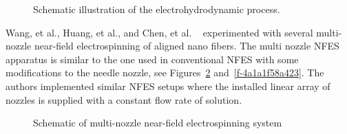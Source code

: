 \documentclass[5p,,preprint,12pt,twocolumn]{elsarticle}
\makeatletter
\def\fixFloatSize#1{}%
\makeatother
\begin{document}
\bgroup
\fixFloatSize{images/fa274bb7-a79d-48ae-9349-953df62c0094-ugupta_00.png}
\begin{figure}[!htbp]
\centering \makeatletter{}
\makeatother 
\caption{{Schematic illustration of the electrohydrodynamic process. \unskip~\protect\cite{527120:11974310}}}
\label{f-74de1f00848b}
\end{figure}
\egroup
Wang, et al., Huang, et al., and Chen, et al. \unskip~\cite{527120:11974322,527120:11974323,527120:11974324} experimented with several multi-nozzle near-field electrospinning of aligned nano fibers. The multi nozzle NFES apparatus is similar to the one used in conventional NFES with some modifications to the needle nozzle, see Figures~\ref{f-96ee25855dea} and~\ref{f-4a1a1f58a423}. The authors implemented similar NFES setups where the installed linear array of nozzles is supplied with a constant flow rate of solution.


\bgroup
\fixFloatSize{images/add2f32e-eac8-460d-a7ff-3d0a7b07c15f-uwang_00.png}
\begin{figure}[!htbp]
\centering \makeatletter{}
\makeatother 
\caption{{Schematic of multi-nozzle near-field electrospinning system \unskip~\protect\cite{527120:11974323}}}
\label{f-96ee25855dea}
\end{figure}
\egroup
\end{document}
